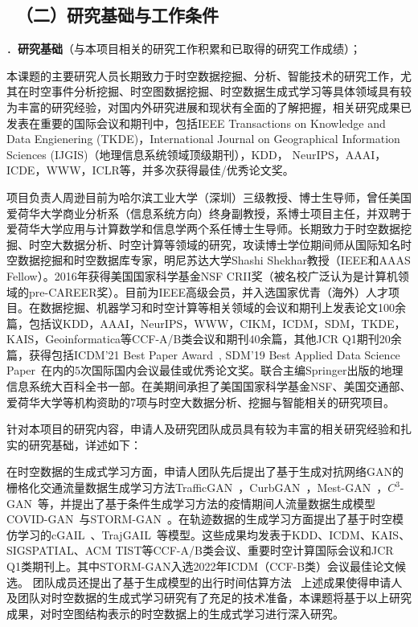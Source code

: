 \documentclass[12pt,UTF8,AutoFakeBold=2,a4paper]{ctexart} %
\newcommand{\sihao}{\fontsize{14pt}{\baselineskip}\selectfont}
\begin{document}
{\color{MsBlue} \subsection{\sihao \kaishu \quad \ （二）研究基础与工作条件 }}
\begin{bibunit}
{\sihao \color{MsBlue} ．{\bfseries 研究基础}（与本项目相关的研究工作积累和已取得的研究工作成绩）；}

本课题的主要研究人员长期致力于时空数据挖掘、分析、智能技术的研究工作，尤其在时空事件分析挖掘、时空图数据挖掘、时空数据生成式学习等具体领域具有较为丰富的研究经验，对国内外研究进展和现状有全面的了解把握，相关研究成果已发表在重要的国际会议和期刊中，包括IEEE Transactions on Knowledge and Data Engienering (TKDE)，International Journal on Geographical Information Sciences (IJGIS)（地理信息系统领域顶级期刊），KDD， NeurIPS，AAAI，ICDE，WWW，ICLR等，并多次获得最佳/优秀论文奖。

项目负责人周逊目前为哈尔滨工业大学（深圳）三级教授、博士生导师，曾任美国爱荷华大学商业分析系（信息系统方向）终身副教授，系博士项目主任，并双聘于爱荷华大学应用与计算数学和信息学两个系任博士生导师。长期致力于时空数据挖掘、时空大数据分析、时空计算等领域的研究，攻读博士学位期间师从国际知名时空数据挖掘和时空数据库专家，明尼苏达大学Shashi Shekhar教授（IEEE和AAAS Fellow）。2016年获得美国国家科学基金NSF CRII奖（被名校广泛认为是计算机领域的pre-CAREER奖）。目前为IEEE高级会员，并入选国家优青（海外）人才项目。在数据挖掘、机器学习和时空计算等相关领域的会议和期刊上发表论文100余篇，包括议KDD，AAAI，NeurIPS，WWW，CIKM，ICDM，SDM，TKDE，KAIS，Geoinformatica等CCF-A/B类会议和期刊40余篇，其他JCR Q1期刊20余篇，获得包括ICDM'21 Best Paper Award~\cite{xie2021statistically}, SDM'19 Best Applied Data Science Paper~\cite{pan2019dissecting}在内的5次国际国内会议最佳或优秀论文奖。联合主编Springer出版的地理信息系统大百科全书一部。在美期间承担了美国国家科学基金NSF、美国交通部、爱荷华大学等机构资助的7项与时空大数据分析、挖掘与智能相关的研究项目。

针对本项目的研究内容，申请人及研究团队成员具有较为丰富的相关研究经验和扎实的研究基础，详述如下：

在时空数据的生成式学习方面，申请人团队先后提出了基于生成对抗网络GAN的栅格化交通流量数据生成学习方法TrafficGAN~\cite{zhang2019trafficgan,zhang2020off}，CurbGAN~\cite{zhang2020curb}，Mest-GAN~\cite{zhang2022mest}，$C^3$-GAN~\cite{zhang2021c}等，并提出了基于条件生成学习方法的疫情期间人流量数据生成模型COVID-GAN~\cite{bao2020covid,bao2022covid}与STORM-GAN~\cite{bao2022storm,bao2023storm}。在轨迹数据的生成学习方面提出了基于时空模仿学习的cGAIL~\cite{zhang2020cgail}、TrajGAIL~\cite{zhang2020trajgail}等模型。这些成果均发表于KDD、ICDM、KAIS、SIGSPATIAL、ACM TIST等CCF-A/B类会议、重要时空计算国际会议和JCR Q1类期刊上。其中STORM-GAN入选2022年ICDM（CCF-B类）会议最佳论文候选。%
团队成员还提出了基于生成模型的出行时间估算方法~\cite{li2019learning}
上述成果使得申请人及团队对时空数据的生成式学习研究有了充足的技术准备，本课题将基于以上研究成果，对时空图结构表示的时空数据上的生成式学习进行深入研究。


\end{bibunit}
\end{document}
